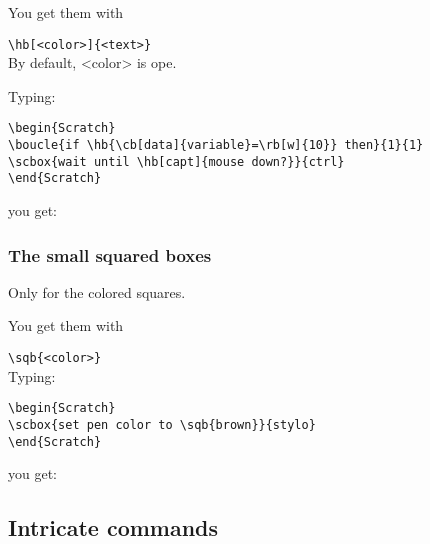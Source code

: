 \documentclass[a4paper,11pt]{article}
\begin{document}
You get them with

\texttt{\textbackslash hb[<color>]\{<text>\}}\\

By default, <color> is ope.

Typing:
\begin{verbatim}
\begin{Scratch}
\boucle{if \hb{\cb[data]{variable}=\rb[w]{10}} then}{1}{1}
\scbox{wait until \hb[capt]{mouse down?}}{ctrl}
\end{Scratch}
\end{verbatim}

you get:\\

\begin{Scratch}
\end{Scratch}


\subsubsection{The small squared boxes}%
Only for the colored squares.

You get them with

\texttt{\textbackslash sqb\{<color>\}}\\

Typing:
\begin{verbatim}
\begin{Scratch}
\scbox{set pen color to \sqb{brown}}{stylo}
\end{Scratch}
\end{verbatim}

you get: 

\subsection{Intricate commands}

\begin{Scratch}%
\end{Scratch}
\end{document}
